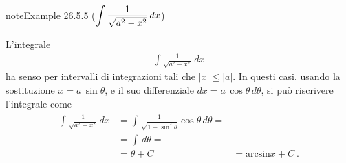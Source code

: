 \documentclass[letterpaper,10pt,italian]{jupyterBook}
\begin{document}
\begin{sphinxadmonition}{note}{Example 26.5.5 (\protect\(\displaystyle \int \frac{1}{\sqrt{a^2 - x^2}} \,  dx\protect\))}



\sphinxAtStartPar
L’integrale
\begin{equation*}
\begin{split}\int \frac{1}{\sqrt{a^2 - x^2}} \,  dx\end{split}
\end{equation*}
\sphinxAtStartPar
ha senso per intervalli di integrazioni tali che \(|x| \le |a|\). In questi casi, usando la sostituzione \(x = a \, \sin \theta\), e il suo differenziale \(dx = a \, \cos \theta \, d \theta\), si può riscrivere l’integrale come
\begin{equation*}
\begin{split}\begin{aligned}
  \int \frac{1}{\sqrt{a^2 - x^2}} \, dx
   & = \int \frac{1}{\sqrt{1- \sin^2 \theta}} \cos \theta \, d \theta = \\
   & = \int \, d \theta = \\
   & = \theta + C
   & = \text{arcsin} x + C \ .
\end{aligned}\end{split}
\end{equation*}\end{sphinxadmonition}
\label{ch/infinitesimal_calculus/integrals:integrals-methods-sub-5}
\end{document}
